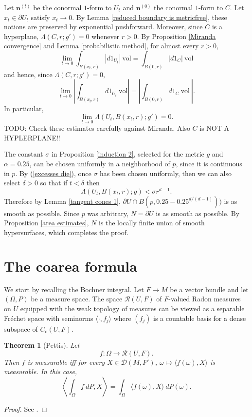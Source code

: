 \documentclass[reqno,12pt,letterpaper]{amsart}
\newcommand{\normal}{\mathbf n}
\newcommand{\vol}{\mathrm{vol}}
\newtheorem{theorem}{Theorem}[section]
\theoremstyle{definition}
\numberwithin{equation}{section}
\begin{document}
Let $\normal^{(t)}$ be the conormal $1$-form to $U_t$ and $\normal^{(0)}$ the conormal $1$-form to $C$.
Let $x_t \in \partial U_t$ satisfy $x_t \to 0$.
By Lemma \ref{reduced boundary is metricfree}, these notions are preserved by exponential pushforward.
Moreover, since $C$ is a hyperplane, $\Lambda(C, r; g') = 0$ whenever $r > 0$.
By Proposition \ref{Miranda convergence} and Lemma \ref{probabilistic method}, for almost every $r > 0$,
$$\lim_{t \to 0} \int_{B(x_t, r)} |d1_{U_t}| ~\vol = \int_{B(0, r)} |d1_C| ~\vol$$
and hence, since $\Lambda(C, r; g') = 0$,
$$\lim_{t \to 0} \left|\int_{B(x_t, r)} d1_{U_t} ~\vol\right| = \left|\int_{B(0, r)} d1_C~\vol~\right|.$$
In particular,
\begin{equation}\label{excesses die}
\lim_{t \to 0} \Lambda(U_t, B(x_t, r); g') = 0.
\end{equation}
TODO: Check these estimates carefully against Miranda. Also $C$ is NOT A HYPLERPLANE!!

The constant $\sigma$ in Proposition \ref{induction 2}, selected for the metric $g$ and $\alpha = 0.25$, can be chosen uniformly in a neighborhood of $p$, since it is continuous in $p$.
By (\ref{excesses die}), once $\sigma$ has been chosen uniformly, then we can also select $\delta > 0$ so that if $t < \delta$ then
$$\Lambda(U_t, B(x_t, r); g) < \sigma r^{d - 1}.$$
Therefore by Lemma \ref{tangent cones 1}, $\partial U \cap B(p, 0.25 - 0.25^{d/(d-1)}))$ is as smooth as possible.
Since $p$ was arbitrary, $N = \partial U$ is as smooth as possible.
By Proposition \ref{area estimates}, $N$ is the locally finite union of smooth hypersurfaces, which completes the proof.



\appendix \section{The coarea formula} \label{coarea section}
We start by recalling the Bochner integral.
Let $F \to M$ be a vector bundle and let $(\Omega, P)$ be a measure space.
The space $\mathcal R(U, F)$ of $F$-valued Radon measures on $U$ equipped with the weak topology of measures can be viewed as a separable Fr\'echet space with seminorms $\langle \cdot, f_j\rangle$ where $(f_j)$ is a countable basis for a dense subspace of $C_c(U, F)$.

\begin{theorem}[Pettis]
Let
$$f: \Omega \to \mathcal R(U, F).$$
Then $f$ is measurable iff for every $X \in \mathcal D(M, F')$, $\omega \mapsto \langle f(\omega), X\rangle$ is measurable.
In this case,
$$\left\langle \int_\Omega f ~dP, X\right\rangle = \int_\Omega \langle f(\omega), X\rangle ~dP(\omega).$$
\end{theorem}
\begin{proof}
See \cite[Chapter V]{yosida2012functional}.
\end{proof}
\end{document}
